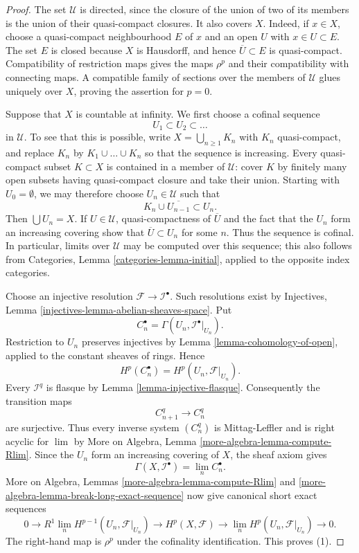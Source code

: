 \begin{proof}
The set $\mathcal{U}$ is directed, since the closure of the union of two
of its members is the union of their quasi-compact closures. It also
covers $X$. Indeed, if $x\in X$, choose a quasi-compact neighbourhood
$E$ of $x$ and an open $U$ with $x\in U\subset E$. The set $E$ is
closed because $X$ is Hausdorff, and hence
$\overline{U}\subset E$ is quasi-compact. Compatibility of restriction
maps gives the maps $\rho^p$ and their compatibility with connecting
maps. A compatible family of sections over the members of
$\mathcal{U}$ glues uniquely over $X$, proving the assertion for $p=0$.

Suppose that $X$ is countable at infinity. We first choose a cofinal
sequence
$$
U_1\subset U_2\subset\ldots
$$
in $\mathcal{U}$. To see that this is possible, write
$X=\bigcup_{n\geq 1}K_n$ with $K_n$ quasi-compact, and replace $K_n$
by $K_1\cup\ldots\cup K_n$ so that the sequence is increasing. Every
quasi-compact subset $K\subset X$ is contained in a member of
$\mathcal{U}$: cover $K$ by finitely many open subsets having
quasi-compact closure and take their union. Starting with
$U_0=\emptyset$, we may therefore choose $U_n\in\mathcal{U}$ such that
$$
K_n\cup\overline{U_{n-1}}\subset U_n.
$$
Then $\bigcup U_n=X$. If $U\in\mathcal{U}$, quasi-compactness of
$\overline{U}$ and the fact that the $U_n$ form an increasing covering
show that $\overline{U}\subset U_n$ for some $n$. Thus the sequence is
cofinal. In particular, limits over $\mathcal{U}$ may be computed over
this sequence; this also follows from Categories, Lemma
\ref{categories-lemma-initial}, applied to the opposite index
categories.

Choose an injective resolution
$\mathcal{F}\to\mathcal{I}^\bullet$. Such resolutions exist by
Injectives, Lemma
\ref{injectives-lemma-abelian-sheaves-space}. Put
$$
C_n^\bullet=\Gamma(U_n,\mathcal{I}^\bullet|_{U_n}).
$$
Restriction to $U_n$ preserves injectives by Lemma
\ref{lemma-cohomology-of-open}, applied to the constant sheaves of
rings. Hence
$$
H^p(C_n^\bullet)=H^p(U_n,\mathcal{F}|_{U_n}).
$$
Every $\mathcal{I}^q$ is flasque by Lemma
\ref{lemma-injective-flasque}. Consequently the transition maps
$$
C_{n+1}^q\longrightarrow C_n^q
$$
are surjective. Thus every inverse system $(C_n^q)$ is Mittag-Leffler
and is right acyclic for $\lim$ by More on Algebra, Lemma
\ref{more-algebra-lemma-compute-Rlim}. Since the $U_n$ form an
increasing covering of $X$, the sheaf axiom gives
$$
\Gamma(X,\mathcal{I}^\bullet)=\lim_n C_n^\bullet.
$$
More on Algebra, Lemmas
\ref{more-algebra-lemma-compute-Rlim} and
\ref{more-algebra-lemma-break-long-exact-sequence} now give canonical
short exact sequences
\begin{equation}
\label{equation-cohomology-limit-relatively-compact-opens}
0\longrightarrow
R^1\lim_n H^{p-1}(U_n,\mathcal{F}|_{U_n})
\longrightarrow H^p(X,\mathcal{F})
\longrightarrow
\lim_n H^p(U_n,\mathcal{F}|_{U_n})
\longrightarrow 0.
\end{equation}
The right-hand map is $\rho^p$ under the cofinality identification.
This proves (1).


\end{proof}
